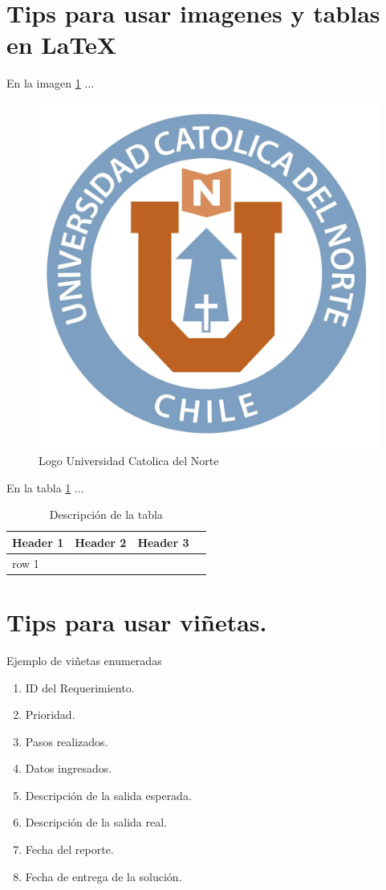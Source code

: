 \documentclass[oneside,12pt, letterpaper, titlepage]{book}
\begin{document}
\section{Tips para usar imagenes y tablas en \LaTeX}
En la imagen \ref{fig:logo} ...
\begin{figure}[H]
    \centering
    \includegraphics[scale=0.3]{./images/u.jpg}
    \caption{Logo Universidad Catolica del Norte}
    \label{fig:logo}
\end{figure}


En la tabla \ref{table:referencia} ...
\begin{table}[H]
\centering
\begin{tabular}{lccc}
\hline
Header 1            & Header 2 & Header 3 \\ \hline
row 1               &          &          \\ \hline
\end{tabular}
\caption{Descripción de la tabla}
\label{table:referencia}
\end{table}
\section{Tips para usar viñetas.}

Ejemplo de viñetas enumeradas
\begin{enumerate}
\item ID del Requerimiento.
\item Prioridad.
\item Pasos realizados.
\item Datos ingresados.
\item Descripción de la salida esperada.
\item Descripción de la salida real.
\item Fecha del reporte.
\item Fecha de entrega de la solución.
\end{enumerate}
\end{document}
